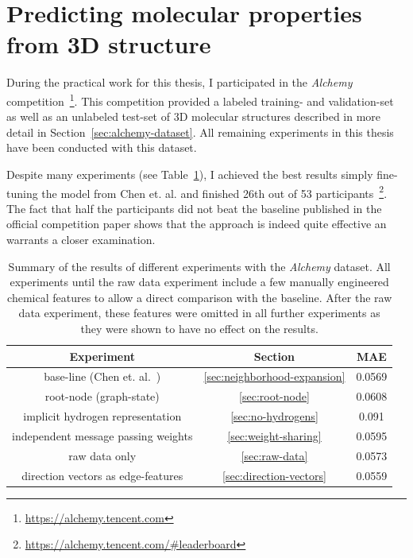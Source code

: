 \section{Predicting molecular properties from 3D structure}
\label{sec:alchemy}

During the practical work for this thesis, I participated in the \textit{Alchemy} competition~\footnote{\url{https://alchemy.tencent.com}}. This competition provided a labeled training- and validation-set as well as an unlabeled test-set of 3D molecular structures described in more detail in Section~\ref{sec:alchemy-dataset}. All remaining experiments in this thesis have been conducted with this dataset.

Despite many experiments (see Table~\ref{tab:alchemy-results}), I achieved the best results simply fine-tuning the model from Chen et. al.\cite{Chen2019} and finished 26th out of 53 participants~\footnote{\url{https://alchemy.tencent.com/\#leaderboard}}. The fact that half the participants did not beat the baseline published in the official competition paper shows that the approach is indeed quite effective an warrants a closer examination.




\begin{table}[H]
\begin{centering}
	\begin{tabular}{||c | c | c||} 
		\hline
		\textbf{Experiment} & \textbf{Section} & \textbf{MAE} \\ [0.5ex] 
		\hline\hline
		base-line (Chen et. al.~\cite{Chen2019})  & \ref{sec:neighborhood-expansion} & 0.0569 \\
		root-node (graph-state) & \ref{sec:root-node} & 0.0608 \\ 
		implicit hydrogen representation & \ref{sec:no-hydrogens} & 0.091 \\
		independent message passing weights & \ref{sec:weight-sharing} & 0.0595 \\
		raw data only & \ref{sec:raw-data} & 0.0573 \\
		direction vectors as edge-features & \ref{sec:direction-vectors} & 0.0559 \\ [1ex] 
		\hline
	\end{tabular}
	\vspace{0.5cm}
	\caption{Summary of the results of different experiments with the \textit{Alchemy} dataset. All experiments until the raw data experiment include a few manually engineered chemical features to allow a direct comparison with the baseline. After the raw data experiment, these features were omitted in all further experiments as they were shown to have no effect on the results.}
	\label{tab:alchemy-results}
\end{centering}
\end{table}


